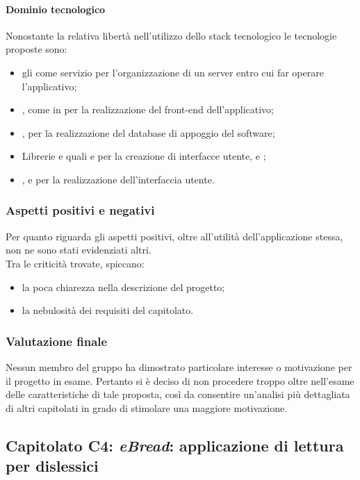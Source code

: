 			\paragraph{Dominio tecnologico}
			Nonostante la relativa libertà nell'utilizzo dello stack tecnologico le tecnologie proposte sono:
			\begin{itemize}
				\item gli  come servizio per l'organizzazione di un server entro cui far operare l'applicativo;
				\item {}, come  in  per la realizzazione del front-end dell'applicativo;
				\item {}, per la realizzazione del database di appoggio del software;
				\item Librerie e  quali  e  per la creazione di interfacce utente,  e ;
				\item {},  e  per la realizzazione dell'interfaccia utente.
			\end{itemize}
		\subsubsection{Aspetti positivi e negativi}
		Per quanto riguarda gli aspetti positivi, oltre all'utilità dell'applicazione stessa, non ne sono stati evidenziati altri.
		\\Tra le criticità trovate, spiccano:
		\begin{itemize}
			\item la poca chiarezza nella descrizione del progetto;
			\item la nebulosità dei requisiti del capitolato.
		\end{itemize}
		\subsubsection{Valutazione finale}
		Nessun membro del gruppo ha dimostrato particolare interesse o motivazione per il progetto in esame. Pertanto si è deciso di non procedere 
		troppo oltre nell'esame delle caratteristiche di tale proposta, così da consentire un'analisi più dettagliata di altri capitolati in grado 
		di stimolare una maggiore motivazione.
		
	\subsection{Capitolato C4: \emph{eBread}: applicazione di lettura per dislessici}
